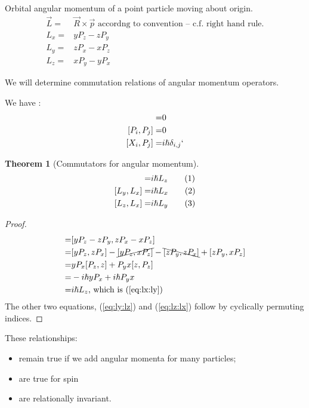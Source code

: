 \documentclass[]{article}
\newcommand\numberthis{\addtocounter{equation}{1}\tag{\theequation}}
\newtheorem{thm}{Theorem}
\begin{document}
Orbital angular momentum of a point particle moving about origin. 
\begin{align*}
\vec{L} =& \vec{R} \times \vec{p} \text{ accordng to convention -- c.f. right hand rule.}\\
L_x =& y P_z - z P_y\\
L_y =& z P_x - x P_z\\
L_z =& x P_y - y P_x
\end{align*}

We will determine commutation relations of angular momentum operators.

We have \cite{susskind2014quantum}:
\begin{align*}
	[X_i,X_j] =& 0\\
	[P_i,P_j]=& 0\\
	[X_i,P_j]=& i \hslash \delta_{i,j}`
\end{align*}

\begin{thm}[Commutators for angular momentum]
	\begin{align*}
	[L_x,L_y]=& i \hslash L_z \numberthis \label{eq:lx:ly}\\
	[L_y,L_x]=& i \hslash L_x \numberthis \label{eq:ly:lz}\\
	[L_z,L_x]=& i \hslash L_y \numberthis \label{eq:lz:lx}	
	\end{align*}
\end{thm}
\begin{proof}
	\begin{align*}
	[L_x,L_y]=& [y P_z - z P_y,z P_x - x P_z]\\
	=&[y P_z, z P_x] -\cancel{[yP_z,xP_z]} -\bcancel{[zP_y,zP_x]} + [z P_y,x P_z] \\
	=& y P_x[P_z,z] + P_y x[z,P_z]\\
	=& -i \hslash y P_x + i \hslash P_y x\\
	=& i \hslash L_z \text{, which is (\ref{eq:lx:ly})} 
	\end{align*}
	The other two equations, (\ref{eq:ly:lz}) and (\ref{eq:lz:lx}) follow by cyclically permuting indices.
\end{proof}

 These relationships:
\begin{itemize}
	\item remain true if we add angular momenta for many particles;
	\item are true for spin
	 \item are relationally invariant.
\end{itemize}
\end{document}
